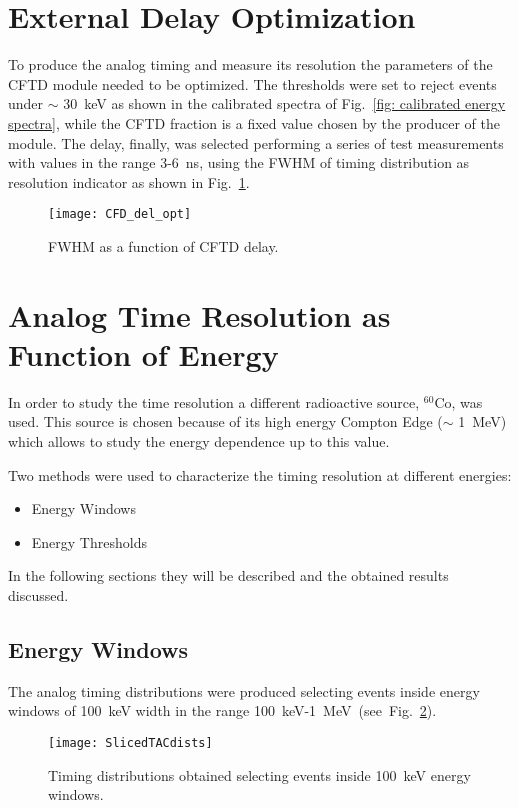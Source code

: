 \section*{External Delay Optimization}
To produce the analog timing and measure its resolution the parameters of the CFTD module needed to be optimized. The thresholds were set to reject events under $\sim$ 30~keV as shown in the calibrated spectra of  Fig.~\ref{fig: calibrated energy spectra}, while the CFTD fraction is a fixed value chosen by the producer of the module. The delay, finally, was selected performing a series of test measurements with values in the range 3-6~ns, using the FWHM of timing distribution as resolution indicator as shown in Fig.~\ref{Fig:CFD_Delay}.

\begin{figure}[h!]
	\centering
	\texttt{[image: CFD\_del\_opt]}
	\caption{FWHM as a function of CFTD delay.}
	\label{Fig:CFD_Delay}
\end{figure}

\section*{Analog Time Resolution as Function of Energy}
In order to study the time resolution a different radioactive source, $^{60}$Co, was used. This source is chosen because of its high energy Compton Edge ($\sim$ 1~MeV) which allows to study the energy dependence up to this value. 

Two methods were used to characterize the  timing resolution at different energies: 
\begin{itemize}
	\item Energy Windows
	\item Energy Thresholds
\end{itemize} 
In the following sections they will be described and the obtained results discussed.
\newpage

\subsection*{Energy Windows}
 The analog timing distributions were produced selecting events inside energy windows of 100~keV width in the range 100~keV-1~MeV~(see~Fig.~\ref{Fig:Energy_slice}). 
\begin{figure}[h!]
	\centering
	\texttt{[image: SlicedTACdists]}
	\caption{Timing distributions obtained selecting events inside 100~keV energy windows.}
	\label{Fig:Energy_slice}
\end{figure}

